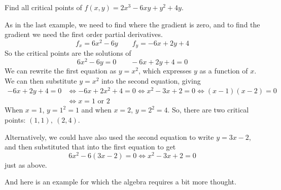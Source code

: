 \begin{eg}[$f(x,y)=2x^3 - 6xy + y^2 +4y $]\label{eg:MXMNlocalB}
Find all critical points of $f(x,y)=2x^3 - 6xy + y^2 +4y $.

\soln 
As in the last example, we need to find where the gradient is zero,
and to find the gradient we need the first order partial derivatives.
\begin{equation*}
f_x=6x^2-6y   \qquad
f_y=-6x+2y+4 
\end{equation*}
So the critical points are the solutions of
\begin{equation*}
6x^2-6y=0   \qquad
-6x+2y+4 = 0
\end{equation*}
We can rewrite the first equation as $y=x^2$, which expresses $y$ as a 
function of $x$. We can then substitute $y=x^2$ into the second equation,
giving
\begin{align*}
-6x+2y+4 = 0
&\iff -6x+2x^2+4 = 0
\iff x^2-3x+2=0 
\iff (x-1)(x-2)=0 \\
&\iff x=1\text{ or }2 
\end{align*}
When $x=1$, $y=1^2=1$ and when $x=2$, $y=2^2=4$.
So, there are two critical points: $(1,1),\ (2,4)$.

Alternatively, we could have also used the second equation to write $y=3x-2$,
and then substituted that into the first equation to get
\begin{equation*}
6x^2-6(3x-2) =0
\iff x^2-3x+2=0
\end{equation*}
just as above.

\end{eg}

And here is an example for which the algebra requires a bit more thought.

